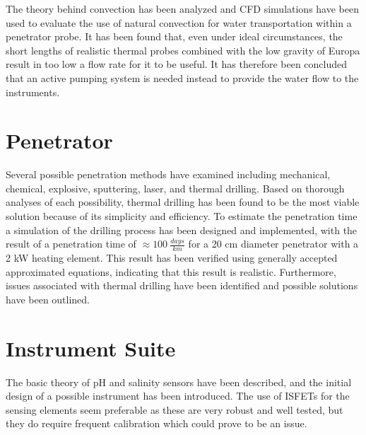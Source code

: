 The theory behind convection has been analyzed and CFD simulations have been used to evaluate the use of natural convection for water transportation within a penetrator probe. It has been found that, even under ideal circumstances, the short lengths of realistic thermal probes combined with the low gravity of Europa result in too low a flow rate for it to be useful. It has therefore been concluded that an active pumping system is needed instead to provide the water flow to the instruments.

\section{Penetrator}
Several possible penetration methods have examined including mechanical, chemical, explosive, sputtering, laser, and thermal drilling. Based on thorough analyses of each possibility, thermal drilling has been found to be the most viable solution because of its simplicity and efficiency. To estimate the penetration time a simulation of the drilling process has been designed and implemented, with the result of a penetration time of $\approx \SI{100}{\frac{days}{km}}$ for a 20 cm diameter penetrator with a 2 kW heating element. This result has been verified using generally accepted approximated equations, indicating that this result is realistic. Furthermore, issues associated with thermal drilling have been identified and possible solutions have been outlined.

\section{Instrument Suite}
The basic theory of pH and salinity sensors have been described, and the initial design of a possible instrument has been introduced. The use of ISFETs for the sensing elements seem preferable as these are very robust and well tested, but they do require frequent calibration which could prove to be an issue. 


